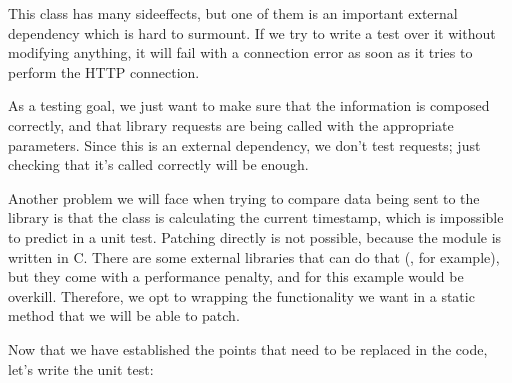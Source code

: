\documentclass[a4paper,10pt,english]{sphinxmanual}
\begin{document}
This class has many side\sphinxhyphen{}effects, but one of them is an important external dependency
which is hard to surmount. If we try to write a test over it without modifying anything, it
will fail with a connection error as soon as it tries to perform the HTTP connection.

As a testing goal, we just want to make sure that the information is composed correctly, and
that library requests are being called with the appropriate parameters. Since this is an
external dependency, we don’t test requests; just checking that it’s called correctly will be
enough.

Another problem we will face when trying to compare data being sent to the library is that
the class is calculating the current timestamp, which is impossible to predict in a unit test.
Patching  directly is not possible, because the module is written in C. There are
some external libraries that can do that (, for example), but they come with a
performance penalty, and for this example would be overkill. Therefore, we opt to
wrapping the functionality we want in a static method that we will be able to patch.

Now that we have established the points that need to be replaced in the code, let’s write the
unit test:
\end{document}
